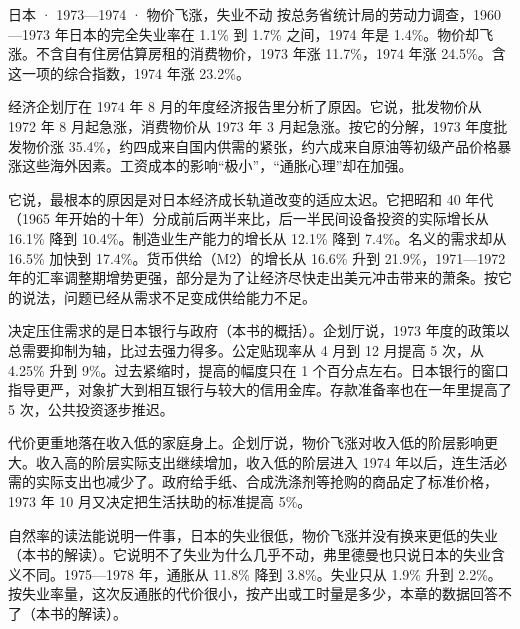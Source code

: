 \begin{case}{日本 · 1973—1974 · 物价飞涨，失业不动}
按总务省统计局的劳动力调查，1960—1973 年日本的完全失业率在 1.1\% 到 1.7\% 之间，1974 年是 1.4\%\cite{estatlfs}。物价却飞涨。不含自有住房估算房租的消费物价，1973 年涨 11.7\%，1974 年涨 24.5\%\cite{estatcpi}。含这一项的综合指数，1974 年涨 23.2\%\cite{estatcpi}。

经济企划厅在 1974 年 8 月的年度经济报告里分析了原因\cite{epa1974}。它说，批发物价从 1972 年 8 月起急涨，消费物价从 1973 年 3 月起急涨\cite{epa1974}。按它的分解，1973 年度批发物价涨 35.4\%，约四成来自国内供需的紧张，约六成来自原油等初级产品价格暴涨这些海外因素\cite{epa1974}。工资成本的影响“极小”，“通胀心理”却在加强\cite{epa1974}。

它说，最根本的原因是对日本经济成长轨道改变的适应太迟\cite{epa1974}。它把昭和 40 年代（1965 年开始的十年）分成前后两半来比，后一半民间设备投资的实际增长从 16.1\% 降到 10.4\%\cite{epa1974}。制造业生产能力的增长从 12.1\% 降到 7.4\%\cite{epa1974}。名义的需求却从 16.5\% 加快到 17.4\%\cite{epa1974}。货币供给（M2）的增长从 16.6\% 升到 21.9\%，1971—1972 年的汇率调整期增势更强，部分是为了让经济尽快走出美元冲击带来的萧条\cite{epa1974}。按它的说法，问题已经从需求不足变成供给能力不足\cite{epa1974}。

决定压住需求的是日本银行与政府（本书的概括）。企划厅说，1973 年度的政策以总需要抑制为轴，比过去强力得多\cite{epa1974}。公定贴现率从 4 月到 12 月提高 5 次，从 4.25\% 升到 9\%\cite{epa1974}。过去紧缩时，提高的幅度只在 1 个百分点左右\cite{epa1974}。日本银行的窗口指导更严，对象扩大到相互银行与较大的信用金库\cite{epa1974}。存款准备率也在一年里提高了 5 次，公共投资逐步推迟\cite{epa1974}。

代价更重地落在收入低的家庭身上。企划厅说，物价飞涨对收入低的阶层影响更大\cite{epa1974}。收入高的阶层实际支出继续增加，收入低的阶层进入 1974 年以后，连生活必需的实际支出也减少了\cite{epa1974}。政府给手纸、合成洗涤剂等抢购的商品定了标准价格，1973 年 10 月又决定把生活扶助的标准提高 5\%\cite{epa1974}。

自然率的读法能说明一件事，日本的失业很低，物价飞涨并没有换来更低的失业（本书的解读）。它说明不了失业为什么几乎不动，弗里德曼也只说日本的失业含义不同\cite{friedman1976}。1975—1978 年，通胀从 11.8\% 降到 3.8\%\cite{estatcpi}。失业只从 1.9\% 升到 2.2\%\cite{estatlfs}。按失业率量，这次反通胀的代价很小，按产出或工时量是多少，本章的数据回答不了（本书的解读）。
\end{case}

